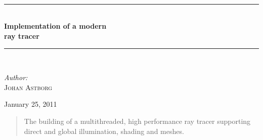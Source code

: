 \documentclass[a4paper,11pt]{report}
\newcommand{\HRule}{\rule{\linewidth}{0.5mm}}
\begin{document}
\begin{titlepage}

\textsc{\LARGE }\\[1.5cm]
\textsc{\Large }\\[0.5cm]
\textsc{\large }\\[0.5cm]
 
\begin{center}
\HRule \\[0.4cm]
{ \huge \bfseries Implementation of a modern\\ ray tracer}\\[0.4cm]
\HRule \\[1.5cm]

\begin{center} \Large
\emph{Author:}\\
\textsc{Johan Astborg}\\[3cm]
\end{center}

{\large January 25, 2011}\\[4cm]
 
\vfill
\end{center}

\end{titlepage}
\begin{abstract}\centering

The building of a multithreaded, high performance ray tracer supporting
direct and global illumination, shading and meshes.
\end{abstract}
\tableofcontents
\listoftables
{}
\listoffigures











\appendix


%
%
%
%
\end{document}

